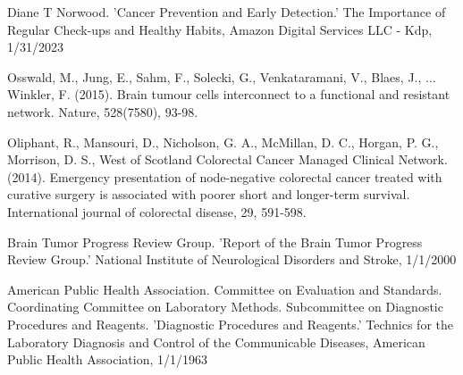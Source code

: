 \documentclass[12pt,oneside]{report}
\begin{document}
\begin{thebibliography}{9}
Diane T Norwood. 'Cancer Prevention and Early Detection.' The Importance of Regular Check-ups and Healthy Habits, Amazon Digital Services LLC - Kdp, 1/31/2023

Osswald, M., Jung, E., Sahm, F., Solecki, G., Venkataramani, V., Blaes, J., ... Winkler, F. (2015). Brain tumour cells interconnect to a functional and resistant network. Nature, 528(7580), 93-98.

Oliphant, R., Mansouri, D., Nicholson, G. A., McMillan, D. C., Horgan, P. G., Morrison, D. S., West of Scotland Colorectal Cancer Managed Clinical Network. (2014). Emergency presentation of node-negative colorectal cancer treated with curative surgery is associated with poorer short and longer-term survival. International journal of colorectal disease, 29, 591-598.

Brain Tumor Progress Review Group. 'Report of the Brain Tumor Progress Review Group.' National Institute of Neurological Disorders and Stroke, 1/1/2000

American Public Health Association. Committee on Evaluation and Standards. Coordinating Committee on Laboratory Methods. Subcommittee on Diagnostic Procedures and Reagents. 'Diagnostic Procedures and Reagents.' Technics for the Laboratory Diagnosis and Control of the Communicable Diseases, American Public Health Association, 1/1/1963
\end{thebibliography}
\end{document}
